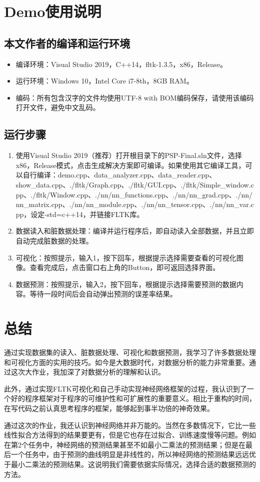 \documentclass[CJK]{ctexart}
\begin{document}
\section{Demo使用说明}
\subsection{本文作者的编译和运行环境}
\begin{itemize}
    \item 编译环境：Visual Studio 2019，C++14，fltk-1.3.5，x86，Release。
    \item 运行环境：Windows 10，Intel Core i7-8th，8GB RAM。
    \item 编码：所有包含汉字的文件均使用UTF-8 with BOM编码保存，请使用该编码打开文件，避免中文乱码。
\end{itemize}
\subsection{运行步骤}
\begin{enumerate}
    \item 使用Visual Studio 2019（推荐）打开根目录下的PSP-Final.sln文件，选择x86，Release模式，点击生成解决方案即可编译。如果使用其它编译工具，可以自行编译：demo.cpp、data\_analyzer.cpp、data\_reader.cpp、show\_data.cpp、./fltk/Graph.cpp、./fltk/GUI.cpp、./fltk/Simple\_window.cpp、./fltk/Window.cpp、./nn/nn\_functions.cpp、./nn/nn\_grad.cpp、./nn/nn\_matrix.cpp、./nn/nn\_module.cpp、./nn/nn\_tensor.cpp、./nn/nn\_var.cpp，设定-std=c++14，并链接FLTK库。
    \item 数据读入和脏数据处理：编译并运行程序后，即自动读入全部数据，并且立即自动完成脏数据的处理。
    \item 可视化：按照提示，输入1，按下回车，根据提示选择需要查看的可视化图像。查看完成后，点击窗口右上角的Button，即可返回选择界面。
    \item 数据预测：按照提示，输入2，按下回车，根据提示选择需要预测的数据内容。等待一段时间后会自动弹出预测的误差率结果。
\end{enumerate}


\section{总结}
通过实现数据集的读入、脏数据处理、可视化和数据预测，我学习了许多数据处理和可视化方面的实用的技巧。如今是大数据时代，对数据分析的能力非常重要。通过这次大作业，我加深了对数据分析的理解和认识。\par
此外，通过实现FLTK可视化和自己手动实现神经网络框架的过程，我认识到了一个好的程序框架对于程序的可维护性和可扩展性的重要意义。相比于重构的时间，在写代码之前认真思考程序的框架，能够起到事半功倍的神奇效果。\par
通过这次的作业，我还认识到神经网络并非万能的。当然在多数情况下，它比一些线性拟合方法得到的结果要更有，但是它也存在过拟合、训练速度慢等问题。例如在第2个任务中，神经网络的预测结果甚至不如最小二乘法的预测结果；但是在最后一个任务中，由于预测的曲线明显是非线性的，所以神经网络的预测结果远远优于最小二乘法的预测结果。这说明我们需要依据实际情况，选择合适的数据预测的方法。
\end{document}
